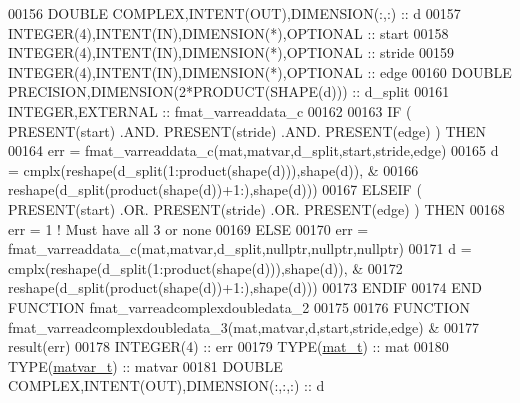 \begin{DoxyCode}
00156     \textcolor{keywordtype}{DOUBLE COMPLEX},\textcolor{keywordtype}{INTENT(OUT)},\textcolor{keywordtype}{DIMENSION(:,:)}   :: d
00157     \textcolor{keywordtype}{INTEGER(4)},\textcolor{keywordtype}{INTENT(IN)},\textcolor{keywordtype}{DIMENSION(*)},\textcolor{keywordtype}{OPTIONAL} :: start
00158     \textcolor{keywordtype}{INTEGER(4)},\textcolor{keywordtype}{INTENT(IN)},\textcolor{keywordtype}{DIMENSION(*)},\textcolor{keywordtype}{OPTIONAL} :: stride
00159     \textcolor{keywordtype}{INTEGER(4)},\textcolor{keywordtype}{INTENT(IN)},\textcolor{keywordtype}{DIMENSION(*)},\textcolor{keywordtype}{OPTIONAL} :: edge
00160     \textcolor{keywordtype}{DOUBLE PRECISION},\textcolor{keywordtype}{DIMENSION(2*PRODUCT(SHAPE(d)))} :: d\_split
00161     \textcolor{keywordtype}{INTEGER},\textcolor{keywordtype}{EXTERNAL}                            :: fmat\_varreaddata\_c
00162 
00163     \textcolor{keywordflow}{IF} ( \textcolor{keyword}{PRESENT}(start) .AND. \textcolor{keyword}{PRESENT}(stride) .AND. \textcolor{keyword}{PRESENT}(edge) ) \textcolor{keywordflow}{THEN}
00164         err = fmat\_varreaddata\_c(mat,matvar,d\_split,start,stride,edge)
00165         d = cmplx(reshape(d\_split(1:product(shape(d))),shape(d)),         &
00166                   reshape(d\_split(product(shape(d))+1:),shape(d)))
00167     \textcolor{keywordflow}{ELSEIF} ( \textcolor{keyword}{PRESENT}(start) .OR. \textcolor{keyword}{PRESENT}(stride) .OR. \textcolor{keyword}{PRESENT}(edge) ) \textcolor{keywordflow}{THEN}
00168         err = 1    \textcolor{comment}{! Must have all 3 or none}
00169     \textcolor{keywordflow}{ELSE}
00170         err = fmat\_varreaddata\_c(mat,matvar,d\_split,nullptr,nullptr,nullptr)
00171         d = cmplx(reshape(d\_split(1:product(shape(d))),shape(d)),         &
00172                   reshape(d\_split(product(shape(d))+1:),shape(d)))
00173 \textcolor{keywordflow}{    ENDIF}
00174 \textcolor{keyword}{END FUNCTION }fmat\_varreadcomplexdoubledata\_2
00175 
00176 \textcolor{keyword}{FUNCTION }fmat\_varreadcomplexdoubledata\_3(mat,matvar,d,start,stride,edge) &
00177                                                        result(err)
00178     \textcolor{keywordtype}{INTEGER(4)}                                  :: err
00179     \textcolor{keywordtype}{TYPE}(\hyperlink{group___m_a_t_gab0fc888f5a5d79943b16284b1f91c2e8}{mat\_t})                                 :: mat
00180     \textcolor{keywordtype}{TYPE}(\hyperlink{group___m_a_t_structmatvar__t}{matvar\_t})                              :: matvar
00181     \textcolor{keywordtype}{DOUBLE COMPLEX},\textcolor{keywordtype}{INTENT(OUT)},\textcolor{keywordtype}{DIMENSION(:,:,:)} :: d

\end{DoxyCode}
